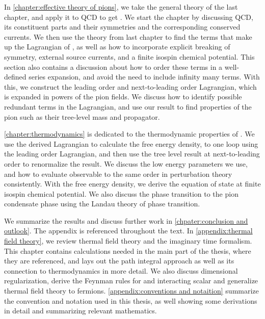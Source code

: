 In \autoref{chapter:effective theory of pions}, we take the general theory of the last chapter, and apply it to QCD to get \chpt.
We start the chapter by discussing QCD, its constituent parts and their symmetries and the corresponding conserved currents.
We then use the theory from last chapter to find the terms that make up the Lagrangian of \chpt, as well as how to incorporate explicit breaking of symmetry, external source currents, and a finite isospin chemical potential.
This section also contains a discussion about how to order these terms in a well-defined series expansion, and avoid the need to include infinity many terms.
With this, we construct the leading order and next-to-leading order Lagrangian, which is expanded in powers of the pion fields.
We discuss how to identify possible redundant terms in the Lagrangian, and use our result to find properties of the pion such as their tree-level mass and propagator.

\cref{chapter:thermodynamics} is dedicated to the thermodynamic properties of \chpt.
We use the derived Lagrangian to calculate the free energy density, to one loop using the leading order Lagrangian, and then use the tree level result at next-to-leading order to renormalize the result.
We discuss the low energy parameters we use, and how to evaluate observable to the same order in perturbation theory consistently.
With the free energy density, we derive the equation of state at finite isospin chemical potential.
We also discuss the phase transition to the pion condensate phase using the Landau theory of phase transition.

We summarize the results and discuss further work in \autoref{chpater:conclusion and outlook}.
The appendix is referenced throughout the text.
In \autoref{appendix:thermal field theory}, we review thermal field theory and the imaginary time formalism.
This chapter contains calculations needed in the main part of the thesis, where they are referenced, and lays out the path integral approach as well as its connection to thermodynamics in more detail.
We also discuss dimensional regularization, derive the Feynman rules for and interacting scalar and generalize thermal field theory to fermions.
\autoref{appendix:conventions and notaition} summarize the convention and notation used in this thesis, as well showing some derivations in detail and summarizing relevant mathematics.


